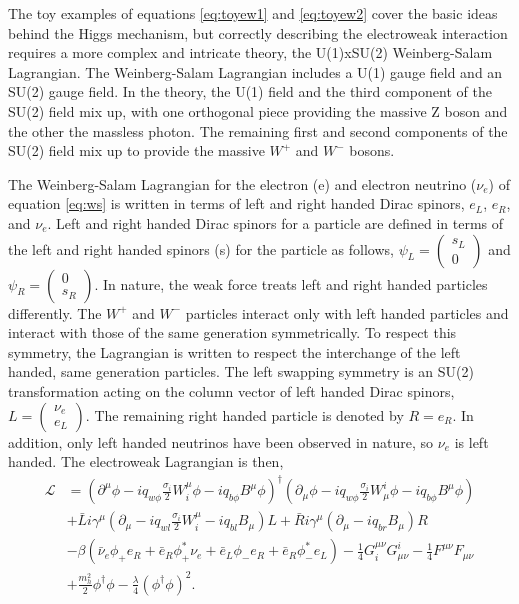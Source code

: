 \documentclass[12pt]{article}
\begin{document}
The toy examples of equations \ref{eq:toyew1} and \ref{eq:toyew2} cover the basic ideas behind the Higgs mechanism, but correctly describing the electroweak interaction requires a more complex and intricate theory, the U(1)xSU(2) Weinberg-Salam Lagrangian. The Weinberg-Salam Lagrangian includes a U(1) gauge field and an SU(2) gauge field. In the theory, the U(1) field and the third component of the SU(2) field mix up, with one orthogonal piece providing the massive Z boson and the other the massless photon. The remaining first and second components of the SU(2) field mix up to provide the massive $W^+$ and $W^-$ bosons. 

The Weinberg-Salam Lagrangian for the electron (e) and electron neutrino ($\nu_e$) of equation \ref{eq:ws} is written in terms of left and right handed Dirac spinors, $e_L$, $e_R$, and $\nu_e$. Left and right handed Dirac spinors for a particle are defined in terms of the left and right handed spinors (s) for the particle as follows, $\psi_L = \begin{pmatrix} s_L \\ 0 \end{pmatrix}$ and $\psi_R = \begin{pmatrix} 0 \\ s_R \end{pmatrix}$. In nature, the weak force treats left and right handed particles differently. The $W^+$ and $W^-$ particles interact only with left handed particles and interact with those of the same generation symmetrically. To respect this symmetry, the Lagrangian is written to respect the interchange of the left handed, same generation particles. The left swapping symmetry is an SU(2) transformation acting on the column vector of left handed Dirac spinors, $L = \begin{pmatrix} \nu_e \\ e_L \end{pmatrix}$. The remaining right handed particle is denoted by $R = e_R$. In addition, only left handed neutrinos have been observed in nature, so $\nu_e$ is left handed. The electroweak Lagrangian is then,  
\begin{equation}
\label{eq:ws}
\begin{split}
\mathcal{L} &= (\partial^\mu\phi - iq_{w\phi}\frac{\sigma_i}{2}W_i^\mu\phi - iq_{b\phi}B^\mu\phi)^\dagger
               (\partial_\mu\phi - iq_{w\phi}\frac{\sigma_i}{2}W^i_\mu\phi - iq_{b\phi}B^\mu\phi) \\ 
            &+ \bar{L}i\gamma^\mu(\partial_\mu - iq_{wl}\frac{\sigma_i}{2}W_i^\mu - iq_{bl}B_\mu)L + \bar{R}i\gamma^\mu(\partial_\mu - iq_{br}B_\mu)R \\
            &- \beta(\bar{\nu}_e\phi_+e_R + \bar{e}_R\phi_+^{*}\nu_e + \bar{e}_L\phi_-e_R + \bar{e}_R\phi_-^{*}e_L) 
             - \frac{1}{4}G_i^{\mu\nu}G^i_{\mu\nu} -\frac{1}{4}F^{\mu\nu}F_{\mu\nu} \\
            &+ \frac{m_h^2}{2}\phi^\dagger\phi - \frac{\lambda}{4}(\phi^\dagger\phi)^2.
\end{split}
\end{equation}
\end{document}
